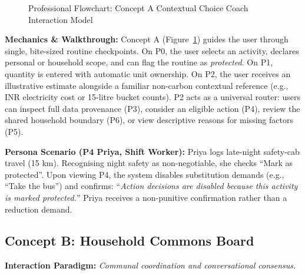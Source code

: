 \documentclass[12pt,a4paper]{article}
\begin{document}
\begin{figure}[ht]
\caption{Professional Flowchart: Concept A Contextual Choice Coach Interaction Model}
\label{fig:concept_a_flow}
\end{figure}

\textbf{Mechanics \& Walkthrough:} Concept A (Figure~\ref{fig:concept_a_flow}) guides the user through single, bite-sized routine checkpoints. On P0, the user selects an activity, declares personal or household scope, and can flag the routine as \emph{protected}. On P1, quantity is entered with automatic unit ownership. On P2, the user receives an illustrative estimate alongside a familiar non-carbon contextual reference (e.g., INR electricity cost or 15-litre bucket counts). P2 acts as a universal router: users can inspect full data provenance (P3), consider an eligible action (P4), review the shared household boundary (P6), or view descriptive reasons for missing factors (P5).

\textbf{Persona Scenario (P4 Priya, Shift Worker):} Priya logs late-night safety-cab travel (15 km). Recognising night safety as non-negotiable, she checks ``Mark as protected''. Upon viewing P4, the system disables substitution demands (e.g., ``Take the bus'') and confirms: ``\emph{Action decisions are disabled because this activity is marked protected.}'' Priya receives a non-punitive confirmation rather than a reduction demand.

\subsection{Concept B: Household Commons Board}
\textbf{Interaction Paradigm:} \emph{Communal coordination and conversational consensus.}
\end{document}
